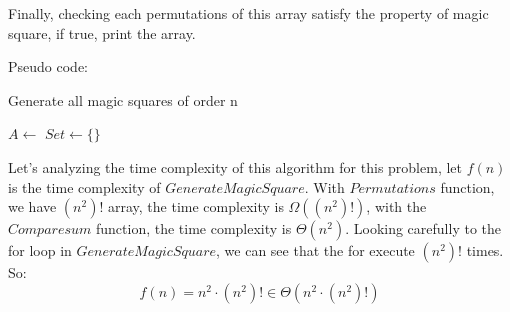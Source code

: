 \documentclass[a4paper]{article}
\begin{document}
\newpage
Finally, checking each permutations of this array satisfy the property of magic square, if true, print the array. \par
Pseudo code: \par
\begin{algorithm}
\renewcommand{\thealgorithm}{3}
\caption{Generate all magic squares of order n}
\begin{algorithmic}
    \State {}
    \EndIf
    \State {}
    \EndIf
    \State $A \gets$  
    \State $Set \gets \{\}$
    \State {}
         
        \State {}
        \EndIf
    \EndFor
\EndProcedure
\end{algorithmic}
\end{algorithm}
Let's analyzing the time complexity of this algorithm for this problem, let $f(n)$ is the time complexity of $GenerateMagicSquare$. With $Permutations$ function, we have $(n^2)!$ array, the time complexity is $\Omega((n^2)!)$, with the $Comparesum$ function, the time complexity is $\Theta(n^2)$. Looking carefully to the for loop in $GenerateMagicSquare$, we can see that the for execute $(n^2)!$ times. So:
\begin{equation*}
    f(n) = n^2 \cdot (n^2)!  \in \Theta(n^2 \cdot (n^2)!)
\end{equation*}

\newpage
\end{document}
